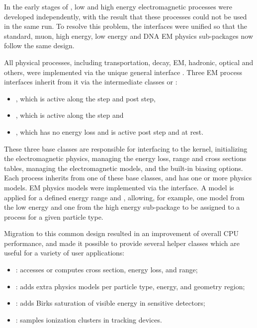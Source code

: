 In the early stages of \Gfour{}, low and high energy electromagnetic processes
were developed independently, with the result that these processes could not
be used in the same run.  To resolve this problem, the interfaces were unified
so that the standard, muon, high energy, low energy and DNA EM physics 
sub-packages \cite{bib:uni} now follow the same design.

All \Gfour{} physical processes, including transportation, decay, EM, hadronic,
optical and others, were implemented via the unique general interface
.  Three EM process interfaces inherit from it via the 
intermediate classes  or 
 \cite{embib:design}:
\begin{itemize}
\item {}, which is active along the step and post
              step,
\item {}, which is active along the step and
\item {}, which has no energy loss and is active post step
              and at rest. 
\end{itemize}
These three base classes are responsible for interfacing to the \Gfour{} kernel, 
initializing the electromagnetic physics, managing the energy loss, range and 
cross sections tables, managing the electromagnetic models, and the built-in 
biasing options.  Each process inherits from one of these base classes, and has
one or more physics models.  EM physics models were implemented via the 
 interface.  A model is applied for a defined energy range 
and , allowing, for example, one model from the low energy and 
one from the high energy sub-package to be assigned to a process for a given 
particle type.

Migration to this common design resulted in an improvement of overall CPU 
performance, and made it possible to provide several helper classes which are 
useful for a variety of user applications:
\begin{itemize}
\item {}: accesses or computes cross section, energy loss,
              and range;
\item {}: adds extra physics models per particle type, 
              energy, and geometry region; 
\item {}: adds Birks saturation of visible energy in
              sensitive detectors;
\item {}: samples ionization clusters in tracking
              devices.
\end{itemize}


